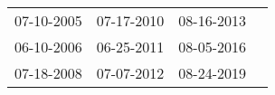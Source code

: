 \begin{supertabular}{llll}
 07-10-2005 &  07-17-2010 &  08-16-2013 \\
 06-10-2006 &  06-25-2011 &  08-05-2016 \\
 07-18-2008 &  07-07-2012 &  08-24-2019 \\
\end{supertabular}
